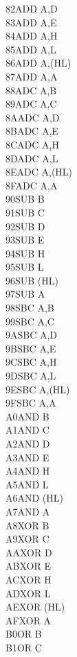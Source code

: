 \documentclass[twoside,openright,a4paper]{book}
\begin{document}
\begin{multicols}{3}
{\begin{tabbing}
	82\>ADD A,D\\
	83\>ADD A,E\\
	84\>ADD A,H\\
	85\>ADD A,L\\
	86\>ADD A,(HL)\\
	87\>ADD A,A\\
	88\>ADC A,B\\
	89\>ADC A,C\\
	8A\>ADC A,D\\
	8B\>ADC A,E\\
	8C\>ADC A,H\\
	8D\>ADC A,L\\
	8E\>ADC A,(HL)\\
	8F\>ADC A,A\\
	90\>SUB B\\
	91\>SUB C\\
	92\>SUB D\\
	93\>SUB E\\
	94\>SUB H\\
	95\>SUB L\\
	96\>SUB (HL)\\
	97\>SUB A\\
	98\>SBC A,B\\
	99\>SBC A,C\\
	9A\>SBC A,D\\
	9B\>SBC A,E\\
	9C\>SBC A,H\\
	9D\>SBC A,L\\
	9E\>SBC A,(HL)\\
	9F\>SBC A,A\\
	A0\>AND B\\
	A1\>AND C\\
	A2\>AND D\\
	A3\>AND E\\
	A4\>AND H\\
	A5\>AND L\\
	A6\>AND (HL)\\
	A7\>AND A\\
	A8\>XOR B\\
	A9\>XOR C\\
	AA\>XOR D\\
	AB\>XOR E\\
	AC\>XOR H\\
	AD\>XOR L\\
	AE\>XOR (HL)\\
	AF\>XOR A\\
	B0\>OR B\\
	B1\>OR C\\

\end{tabbing}}
\end{multicols}
\end{document}
